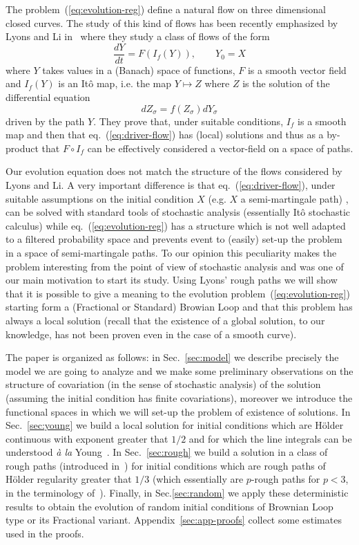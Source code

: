 \documentclass[a4paper,12pt,reqno]{amsart}
\begin{document}
The problem~(\ref{eq:evolution-reg}) define a natural flow on three
dimensional closed curves. The study of this kind of flows has been
recently emphasized by Lyons and Li in~\cite{LiLyons} where they study
a class of flows of the form
\begin{equation}
  \label{eq:driver-flow}
\frac{dY}{dt} = F(I_f(Y)), \qquad Y_0 = X  
\end{equation}
where $Y$ takes values in a (Banach) space of functions, $F$ is a
smooth vector field and $I_f(Y)$ is an It\^o map, i.e. the map $Y
\mapsto Z$ where $Z$ is the solution of
the differential equation
$$
dZ_\sigma = f(Z_\sigma) dY_\sigma
$$
driven by the path $Y$. They prove that, under suitable conditions,
$I_f$ is a smooth map and then that eq.~(\ref{eq:driver-flow})
has (local) solutions and thus as a by-product that $F \circ I_f$ can
be effectively considered a vector-field on a space of paths. 

Our evolution
equation does not match the structure of the flows considered by Lyons
and Li. A very important difference is that eq.~(\ref{eq:driver-flow}),
under suitable assumptions on the initial condition $X$ (e.g.  $X$ a
semi-martingale path)
, can be solved with standard tools of
stochastic analysis (essentially It\^o stochastic calculus) while
eq.~(\ref{eq:evolution-reg}) has a structure which is not well adapted
to a filtered probability space and prevents event to (easily) set-up
the problem in a space of semi-martingale paths. To our opinion this
peculiarity makes the problem interesting from the point of view of
stochastic analysis and was one of our main motivation to start its
study. 
Using Lyons' rough paths we will show that it is possible to give a
meaning to the evolution problem~(\ref{eq:evolution-reg}) starting form a (Fractional or
Standard) Browian Loop and that this problem has always a local
solution (recall that the existence of a global solution, to our
knowledge, has not been proven even in the case of a smooth curve). 

The paper is organized as follows: in Sec.~\ref{sec:model} we describe
precisely the model we are going to analyze and we make some
preliminary observations on the structure of covariation (in the
sense of stochastic analysis) of the
solution (assuming the initial condition has finite covariations),
moreover we introduce the functional spaces in which we will set-up
the problem of existence of solutions. In Sec.~\ref{sec:young} we
build a local solution for initial conditions which are H\"older
continuous with exponent greater that $1/2$ and for which the line
integrals can be understood \emph{\`a la} Young~\cite{young}. In
Sec.~\ref{sec:rough} we build a solution in a class of rough paths
(introduced in~\cite{Gubinelli}) for initial conditions which are
rough paths of H\"older regularity greater that $1/3$ (which
essentially are $p$-rough paths for $p < 3$, in the terminology
of~\cite{LyonsBook}). Finally, in Sec.\ref{sec:random} we apply these
deterministic results to obtain the evolution of random initial
conditions of Brownian Loop type or its Fractional
variant. Appendix~\ref{sec:app-proofs} collect some estimates used in
the proofs.
\end{document}
